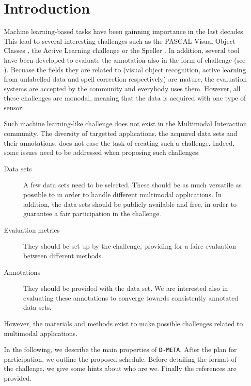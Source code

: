 \documentclass{sig-alternate}
\begin{document}
\section{Introduction}
Machine learning-based tasks have been gainning importance in the last decades. This lead to several interesting
challenges such as the PASCAL Visual Object Classes \cite{PascalVOC}, the Active Learning challenge
\cite{ActiveLearning} or the Speller \cite{Speller}. In addition, several tool have been developed to evaluate the
annotation also in the form of challenge (see \cite{Give}). Becuase the fields they are related to (visual object
recognition, active learning from unlabelled data and spell correction respectively) are mature, the evaluation systems
are accepted by the community and everybody uses them. However, all these challenges are monodal, meaning that the data
is acquired with one type of sensor.\vspace{0.3cm}

Such machine learning-like challenge does not exist in the Multimodal Interaction community. The diversity of
targetted applications, the acquired data sets and their annotations, does not ease the task of creating such a
challenge. Indeed, some issues need to be addressed when proposing such challenges:
\begin{description}
 \item [Data sets] A few data sets need to be selected. These should be as much versatile as possible to in order to
handle different multimodal applications. In addition, the data sets should be publicly available and free, in order to
guarantee a fair participation in the challenge.
 \item [Evaluation metrics] They should be set up by the challenge, providing for a faire evaluation between different
methods.
 \item [Annotations] They should be provided with the data set. We are interested also in evaluating these annotations
to converge towards consistently annotated data sets.
\end{description}
However, the materials and methods exist to make possible challenges related to multimodal applications.\vspace{0.3cm}

In the following, we describe the main properties of \texttt{D-META}. After the plan for participation, we outline
the proposed schedule. Before detailing the format of the challenge, we give some hints about who are we. Finally the
references are provided.
\end{document}
